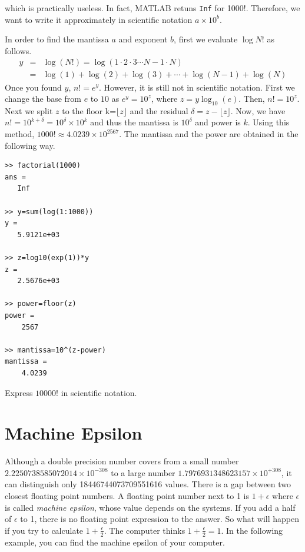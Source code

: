 \begin{example}
which is practically useless.  In fact, MATLAB retuns \texttt{Inf} for 1000!.
Therefore, we want to write it approximately in scientific notation  $a \times 10^{b}$.

In order to find the mantissa $a$ and exponent $b$, first we evaluate $\log N!$ as follows.
\begin{eqnarray}
y&=&\log(N!) = \log(1 \cdot 2 \cdot 3 \cdots N-1 \cdot N) \nonumber \\
&=& \log(1)+\log(2)+\log(3)+\cdots + \log(N-1)+\log(N)
\end{eqnarray}
Once you found $y$, $n! = e^y$.  However, it is still not in scientific notation.  First we change the base from $e$ to $10$ as $e^y  = 10^z $,  where $z = y \log_{10}(e)$.  Then, $n! = 10^z$.
Next we split $z$ to the floor k=$\lfloor z \rfloor$ and the residual $\delta=z - \lfloor z \rfloor$.
Now, we have $n! = 10^{k+\delta} = 10^\delta \times 10^k$ and thus the mantissa is $10^\delta$ and power is $k$.  Using this method, $1000! \approx 4.0239 \times 10^{2567}$. The mantissa and the power are obtained in the following way.

\bigskip
\small
\begin{mybox}
	\begin{verbatim}
>> factorial(1000)
ans =
   Inf

>> y=sum(log(1:1000))
y =
   5.9121e+03

>> z=log10(exp(1))*y
z =
   2.5676e+03
   
>> power=floor(z)
power =
    2567
    
>> mantissa=10^(z-power)
mantissa =
    4.0239
   \end{verbatim}
\end{mybox}
\normalsize
\end{example}

\noindent
\exercise
Express $10000!$ in scientific notation.

\bigskip
\noindent
\section{Machine Epsilon}\label{sec:epsilon}

Although a double precision number covers from a small number $2.2250738585072014\times 10^{-308}$ to a large number $1.7976931348623157 \times 10^{+308}$, it can distinguish only 18446744073709551616 values.  There is a gap between two closest floating point numbers.  A floating point number next to 1 is $1+\epsilon$ where $\epsilon$ is called \emph{machine epsilon}, whose value depends on the systems.  If you add a half of $\epsilon$ to 1, there is no floating point expression to the answer.  So what will happen if you try to calculate $1+\displaystyle\frac{\epsilon}{2}$. The computer thinks $1+\displaystyle\frac{\epsilon}{2} = 1$.  In the following example, you can find the machine epsilon of your computer.


